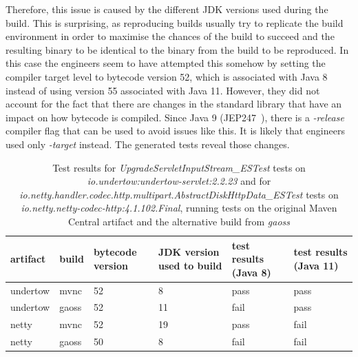 \documentclass[conference]{IEEEtran}
\begin{document}
Therefore, this issue is caused by the different JDK versions used during the build. This is surprising, as reproducing builds usually try to replicate the build environment in order to maximise the chances of the build to succeed and the resulting binary to be identical to the binary from the build to be reproduced. In this case the engineers seem to have attempted this somehow by setting the compiler target level to bytecode version 52, which is associated with Java 8~\cite[Sect. 4.1]{JVM17Spec} instead of using version 55 associated with Java 11.  However, they did not account for the fact that there are changes in the standard library that have an impact on how bytecode is compiled. Since Java 9 (JEP247~\cite{jep247}), there is a \textit{-release} compiler  flag that can be used to avoid issues like this. It is likely that engineers used only \textit{-target} instead. The generated tests reveal those changes.  

\begin{table}[h]
	\centering
	\begin{tabular}{|p{0.9cm}p{0.6cm}p{0.9cm}p{1.5cm}p{1.2cm}p{1.2cm}|}
		\hline
		artifact & build         & bytecode version & JDK version used to build & test results (Java 8)                                                    & test results (Java 11) \\ \hline 
		undertow & mvnc & 52               & 8                         & pass                                                                     & pass                   \\
		undertow & gaoss         & 52               & 11                        & fail & pass                  \\ \hline
		netty & mvnc & 52               & 19                         & pass                                                                     & fail                   \\
		netty & gaoss         & 50               & 8                        & fail & fail                  \\ \hline
	\end{tabular}
	\caption{Test results for \textit{UpgradeServletInputStream\_ESTest} tests on \textit{io.undertow:undertow-servlet:2.2.23} and for \textit{io.netty.handler.codec.http.multipart.AbstractDiskHttpData\_ESTest} tests on \textit{io.netty.netty-codec-http:4.1.102.Final}, running tests on the original Maven Central artifact and the alternative build from \textit{gaoss}}
	\label{tab:nosuchmethoderror}
\end{table}
\end{document}
